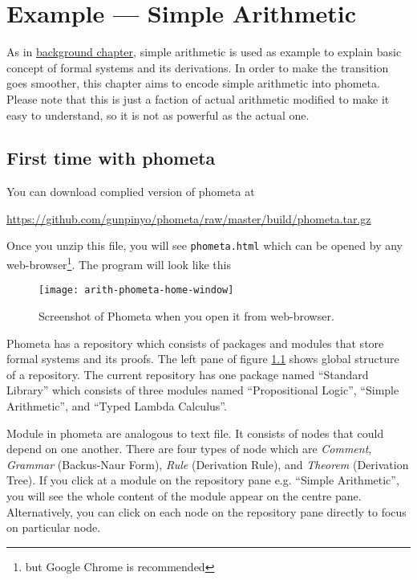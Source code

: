 \documentclass[master.tex]{subfiles}
\begin{document}
\chapter{Example --- Simple Arithmetic}
\label{chap:example_simple_arithmetic}

As in \hyperref[chap:background]{background chapter}, simple arithmetic is
used as example to explain basic concept of formal systems and its derivations.
In order to make the transition goes smoother, this chapter aims to encode
simple arithmetic into phometa. Please note that this is just a faction of
actual arithmetic modified to make it easy to understand, so it is not as
powerful as the actual one.

\section{First time with phometa}

You can download complied version of phometa at

{\centering\url{https://github.com/gunpinyo/phometa/raw/master/build/phometa.tar.gz}}

Once you unzip this file, you will see \texttt{phometa.html} which can be
opened by any web-browser\footnote{but Google Chrome is recommended}. The
program will look like this

\begin{figure}[H]
    \centering
    \texttt{[image: arith-phometa-home-window]}
    \caption{Screenshot of Phometa when you open it from web-browser.}
\label{fig:arith-phometa-home-window}
\end{figure}

Phometa has a repository which consists of packages and modules that store
formal systems and its proofs. The left pane of figure
\ref{fig:arith-phometa-home-window} shows global structure of a repository. The
current repository has one package named ``Standard Library'' which consists of
three modules named ``Propositional Logic'', ``Simple Arithmetic'', and ``Typed
Lambda Calculus''.

Module in phometa are analogous to text file. It consists of nodes that could
depend on one another. There are four types of node which are \emph{Comment},
\emph{Grammar} (Backus-Naur Form), \emph{Rule} (Derivation Rule), and
\emph{Theorem} (Derivation Tree). If you click at a module on the repository
pane e.g. ``Simple Arithmetic'', you will see the whole content of the module
appear on the centre pane. Alternatively, you can click on each node on the
repository pane directly to focus on particular node.
\end{document}
